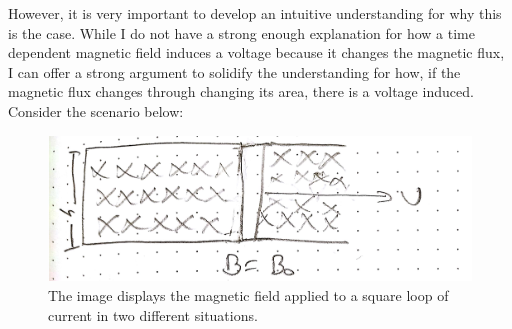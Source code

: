 \documentclass{article}
\begin{document}
However, it is very important to develop an intuitive understanding for why this is the case. While I do not have a strong enough explanation for how a time dependent magnetic field induces a voltage because it changes the magnetic flux, I can offer a strong argument to solidify the understanding for how, if the magnetic flux changes through changing its area, there is a voltage induced. Consider the scenario below:

\begin{figure}[ht]
\center
\includegraphics[width=.3\textwidth]{images/Week3pic5.jpg}
\caption{The image displays the magnetic field applied to a square loop of current in two different situations.}
\end{figure}
\end{document}
